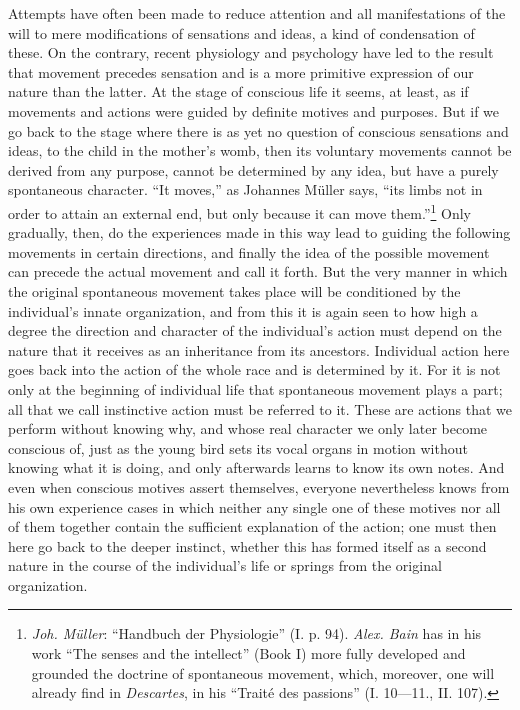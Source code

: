 \documentclass[12pt,a4paper,openany]{book}
\newcommand{\opage}[1]{\marginnote{\footnotesize\textit{[#1]}}}
\begin{document}
Attempts have often been made to reduce attention and all manifestations of
the will to mere modifications of sensations and ideas, a kind of
condensation of these. On the contrary, recent physiology and psychology
have led to the result that movement precedes sensation and is a more
primitive expression of our nature than the latter. At the stage of
conscious life it seems, at least, as if movements and actions were guided
by definite motives and purposes. But if we go back to the stage where
there is as yet no question of conscious sensations and ideas, to the child
in the mother's womb, then its voluntary movements cannot be derived from
any purpose, cannot be determined by any \opage{11}idea, but have a purely
spontaneous character. ``It moves,'' as Johannes Müller says, ``its limbs
not in order to attain an external end, but only because it can move
them.''\footnote[1]{\emph{Joh. Müller}: ``Handbuch der Physiologie'' (I. p.
94). \emph{Alex. Bain} has in his work ``The senses and the intellect''
(Book I) more fully developed and grounded the doctrine of spontaneous
movement, which, moreover, one will already find in \emph{Descartes}, in his
``Traité des passions'' (I. 10---11., II. 107).} Only gradually, then, do
the experiences made in this way lead to guiding the following movements in
certain directions, and finally the idea of the possible movement can
precede the actual movement and call it forth. But the very manner in which
the original spontaneous movement takes place will be conditioned by the
individual's innate organization, and from this it is again seen to how
high a degree the direction and character of the individual's action must
depend on the nature that it receives as an inheritance from its ancestors.
Individual action here goes back into the action of the whole race and is
determined by it. For it is not only at the beginning of individual life
that spontaneous movement plays a part; all that we call instinctive action
must be referred to it. These are actions that we perform without knowing
why, and whose real character we only later become conscious of, just as
the young bird sets its vocal organs in motion without knowing what it is
doing, and only afterwards learns to know its own notes. And even when
conscious motives assert themselves, everyone nevertheless knows from his
own \opage{12}experience cases in which neither any single one of these
motives nor all of them together contain the sufficient explanation of the
action; one must then here go back to the deeper instinct, whether this has
formed itself as a second nature in the course of the individual's life or
springs from the original organization.
\end{document}
